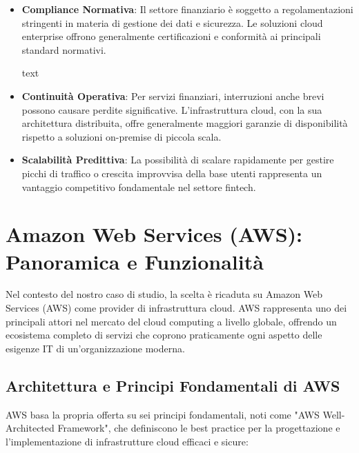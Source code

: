 \documentclass[a4paper,12pt]{report}
\begin{document}
\begin{itemize}
\item \textbf{Compliance Normativa}: Il settore finanziario è soggetto a regolamentazioni stringenti in materia di gestione dei dati e sicurezza. Le soluzioni cloud enterprise offrono generalmente certificazioni e conformità ai principali standard normativi.

text
\item \textbf{Continuità Operativa}: Per servizi finanziari, interruzioni anche brevi possono causare perdite significative. L'infrastruttura cloud, con la sua architettura distribuita, offre generalmente maggiori garanzie di disponibilità rispetto a soluzioni on-premise di piccola scala.

\item \textbf{Scalabilità Predittiva}: La possibilità di scalare rapidamente per gestire picchi di traffico o crescita improvvisa della base utenti rappresenta un vantaggio competitivo fondamentale nel settore fintech.
\end{itemize}

\section{Amazon Web Services (AWS): Panoramica e Funzionalità}

Nel contesto del nostro caso di studio, la scelta è ricaduta su Amazon Web Services (AWS) come provider di infrastruttura cloud. AWS rappresenta uno dei principali attori nel mercato del cloud computing a livello globale, offrendo un ecosistema completo di servizi che coprono praticamente ogni aspetto delle esigenze IT di un'organizzazione moderna.

\subsection{Architettura e Principi Fondamentali di AWS}

AWS basa la propria offerta su sei principi fondamentali, noti come "AWS Well-Architected Framework", che definiscono le best practice per la progettazione e l'implementazione di infrastrutture cloud efficaci e sicure:
\end{document}
